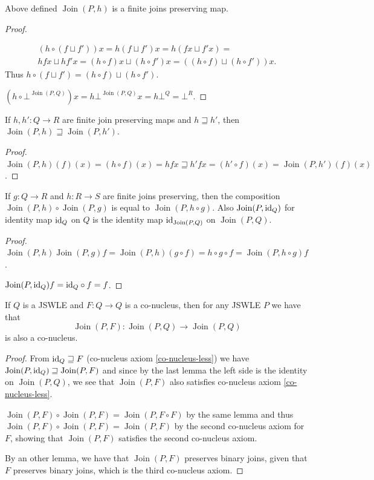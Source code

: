 \begin{lem}
Above defined $\operatorname{Join}(P,h)$ is a finite joins preserving
map.\end{lem}
\begin{proof}
~

\begin{multline*}
(h\circ(f\sqcup f'))x=h(f\sqcup f')x=h(fx\sqcup f'x)=\\
hfx\sqcup hf'x=(h\circ f)x\sqcup(h\circ f')x=((h\circ f)\sqcup(h\circ f'))x.
\end{multline*}
Thus $h\circ(f\sqcup f')=(h\circ f)\sqcup(h\circ f')$.

$(h\circ\bot^{\operatorname{Join}(P,Q)})x=h\bot^{\operatorname{Join}(P,Q)}x=h\bot^Q=\bot^R$.\end{proof}
\begin{prop}
If $h,h':Q\rightarrow R$ are finite join preserving maps and $h\sqsupseteq h'$,
then $\operatorname{Join}(P,h)\sqsupseteq\operatorname{Join}(P,h')$.\end{prop}
\begin{proof}
$\operatorname{Join}(P,h)(f)(x)=(h\circ f)(x)=hfx\sqsupseteq h'fx=(h'\circ f)(x)=\operatorname{Join}(P,h')(f)(x)$.\end{proof}
\begin{lem}
If $g:Q\rightarrow R$ and $h:R\rightarrow S$ are finite joins preserving,
then the composition $\operatorname{Join}(P,h)\circ\operatorname{Join}(P,g)$
is equal to $\operatorname{Join}(P,h\circ g)$. Also $\operatorname{Join}(P,{\operatorname{id}}_{Q})$
for identity map ${\operatorname{id}}_{Q}$ on $Q$ is the identity map ${\operatorname{id}}_{\operatorname{Join}(P,Q)}$
on $\operatorname{Join}(P,Q)$.\end{lem}
\begin{proof}
$\operatorname{Join}(P,h)\operatorname{Join}(P,g)f=\operatorname{Join}(P,h)(g\circ f)=h\circ g\circ f=\operatorname{Join}(P,h\circ g)f$.

$\operatorname{Join}(P,{\operatorname{id}}_{Q})f={\operatorname{id}}_{Q}\circ f=f$.\end{proof}
\begin{cor}
\label{join-map-co-nucleus}If $Q$ is a JSWLE and $F:Q\rightarrow Q$
is a co-nucleus, then for any JSWLE $P$ we have that 
\[
\operatorname{Join}(P,F):\operatorname{Join}(P,Q)\rightarrow\operatorname{Join}(P,Q)
\]
 is also a co-nucleus.\end{cor}
\begin{proof}
From ${\operatorname{id}}_{Q}\sqsupseteq F$ (co-nucleus axiom \ref{co-nucleus-less})
we have $\operatorname{Join}(P,{\operatorname{id}}_{Q})\sqsupseteq\operatorname{Join}(P,F)$
and since by the last lemma the left side is the identity on $\operatorname{Join}(P,Q)$,
we see that $\operatorname{Join}(P,F)$ also satisfies co-nucleus
axiom \ref{co-nucleus-less}.

$\operatorname{Join}(P,F)\circ\operatorname{Join}(P,F)=\operatorname{Join}(P,F\circ F)$
by the same lemma and thus $\operatorname{Join}(P,F)\circ\operatorname{Join}(P,F)=\operatorname{Join}(P,F)$
by the second co-nucleus axiom for $F$, showing that $\operatorname{Join}(P,F)$
satisfies the second co-nucleus axiom.

By an other lemma, we have that $\operatorname{Join}(P,F)$ preserves
binary joins, given that $F$ preserves binary joins, which is the
third co-nucleus axiom.\end{proof}
